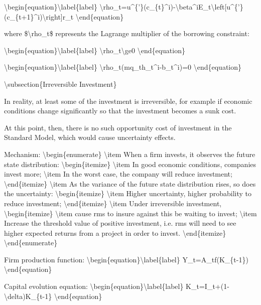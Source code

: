 \documentclass[10pt,math=newtx,citestyle=gb7714-2015,bibstyle=gb7714-2015]{elegantbook}
\begin{document}
	\textbackslash{}begin\{equation\}\textbackslash{}label\{label\}
	\textbackslash{}rho\_t=u\^{}\{'\}(c\_\{t\}\^{}i)-\textbackslash{}beta\^{}iE\_t\textbackslash{}left[u\^{}\{'\}(c\_\{t+1\}\^{}i)\textbackslash{}right]r\_t
	\textbackslash{}end\{equation\}
	
	where \$\textbackslash{}rho\_t\$ represents the Lagrange multiplier of the borrowing constraint:
	
	\textbackslash{}begin\{equation\}\textbackslash{}label\{label\}
	\textbackslash{}rho\_t\textbackslash{}ge0
	\textbackslash{}end\{equation\}
	
	\textbackslash{}begin\{equation\}\textbackslash{}label\{label\}
	\textbackslash{}rho\_t(mq\_th\_t\^{}i-b\_t\^{}i)=0
	\textbackslash{}end\{equation\}
	
	\textbackslash{}subsection\{Irreversible Investment\}
	
	In reality, at least some of the investment is irreversible, for example if economic conditions change significantly so that the investment becomes a sunk cost.
	
	At this point, then, there is no such opportunity cost of investment in the Standard Model, which would cause uncertainty effects.
	
	Mechanism:
	\textbackslash{}begin\{enumerate\}
	\textbackslash{}item When a firm invests, it observes the future state distribution:
	\textbackslash{}begin\{itemize\}
	\textbackslash{}item In good economic conditions, companies invest more;
	\textbackslash{}item In the worst case, the company will reduce investment;
	\textbackslash{}end\{itemize\}
	\textbackslash{}item As the variance of the future state distribution rises, so does the uncertainty:
	\textbackslash{}begin\{itemize\}
	\textbackslash{}item Higher uncertainty, higher probability to reduce investment;
	\textbackslash{}end\{itemize\}
	\textbackslash{}item Under irreversible investment,
	\textbackslash{}begin\{itemize\}
	\textbackslash{}item cause rms to insure against this be waiting to invest;
	\textbackslash{}item Increase the threshold value of positive investment, i.e. rms will need to see higher expected returns from a project in order to invest.
	\textbackslash{}end\{itemize\}
	\textbackslash{}end\{enumerate\}
	
	Firm production function:
	\textbackslash{}begin\{equation\}\textbackslash{}label\{label\}
	Y\_t=A\_tf(K\_\{t-1\})
	\textbackslash{}end\{equation\}
	
	Capital evolution equation:
	\textbackslash{}begin\{equation\}\textbackslash{}label\{label\}
	K\_t=I\_t+(1-\textbackslash{}delta)K\_\{t-1\}
	\textbackslash{}end\{equation\}
	
\end{document}
